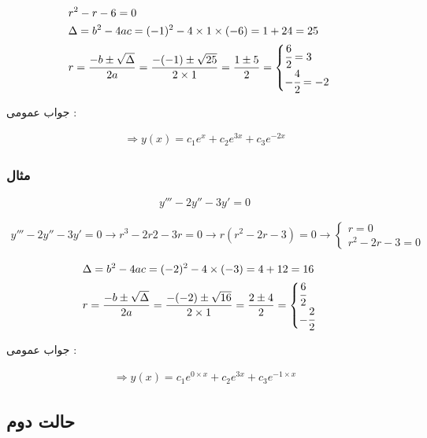 \documentclass[12pt]{book}
\begin{document}
\begin{align*}
&r^{2} - r - 6 = 0 \\
&\Delta = b^{2} - 4ac = (-1)^{2} - 4 \times 1 \times (-6) = 1 + 24 = 25 \\
&r = \frac{-b \pm \sqrt{\Delta}}{2a} = \frac{-(-1) \pm \sqrt{25}}{2 \times 1} = \frac{1 \pm 5}{2} = 
\begin{cases}
\cfrac{6}{2} = 3 \\
- \cfrac{4}{2} = -2 
\end{cases} \\
\end{align*}

جواب عمومی :

\begin{align*}
\Rightarrow y(x) = c_{1}e^{x} + c_{2}e^{3x} + c_{3}e^{-2x}
\end{align*}

\subsubsection{مثال}

$$
y''' - 2y'' - 3y' = 0
$$

\begin{align*}
y''' - 2y'' - 3y' = 0 \to r^{3} - 2r{2} - 3r = 0 \to r(r^{2} - 2r - 3) = 0 \to 
\begin{cases}
r = 0 \\
r^{2} - 2r - 3 = 0 
\end{cases}
\end{align*}


\begin{align*}
&\Delta = b^{2} - 4ac = (-2)^{2} - 4 \times (-3) = 4 + 12 = 16 \\
&r = \frac{-b \pm \sqrt{\Delta}}{2a} = \frac{-(-2) \pm \sqrt{16}}{2 \times 1} = \frac{2 \pm 4}{2} = 
\begin{cases}
\cfrac{6}{2} \\
- \cfrac{2}{2} \\
\end{cases} \\
\end{align*}

جواب عمومی :

\begin{align*}
\Rightarrow y(x) = c_{1}e^{0 \times x} + c_{2} e^{3x} + c_{3}e^{-1 \times x}
\end{align*}




\subsection{حالت دوم}
\end{document}
